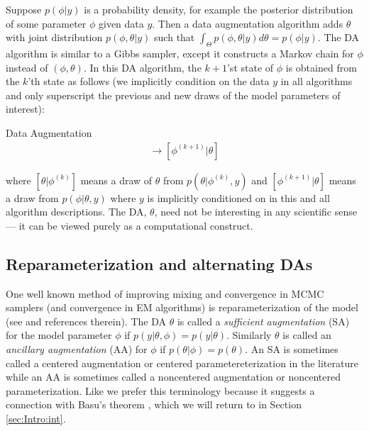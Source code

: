 \documentclass[12pt]{article}
\begin{document}
Suppose $p(\phi|y)$ is a probability density, for example the posterior distribution of some parameter $\phi$ given data $y$. %
Then a data augmentation algorithm adds $\theta$ with joint distribution $p(\phi,\theta|y)$ such that $\int_{\Theta}p(\phi,\theta|y)d\theta = p(\phi|y)$. The DA algorithm is similar to a Gibbs sampler, except it constructs a Markov chain for $\phi$ instead of $(\phi, \theta)$. In this DA algorithm, the $k+1$'st state of $\phi$ is obtained from the $k$'th state as follows (we implicitly condition on the data $y$ in all algorithms and only superscript the previous and new draws of the model parameters of interest):
\begin{alg*}[DA]Data Augmentation\label{alg:DA}
  \begin{align*}
  [\theta|\phi^{(k)}] \to [\phi^{(k+1)}|\theta]
\end{align*}
\end{alg*}
\noindent where $[\theta|\phi^{(k)}]$ means a draw of $\theta$ from $p(\theta|\phi^{(k)},y)$ and $[\phi^{(k+1)}|\theta]$ means a draw from $p(\phi|\theta,y)$ where $y$ is implicitly conditioned on in this and all algorithm descriptions. The DA, $\theta$, need not be interesting in any scientific sense --- it can be viewed purely as a computational construct. 

\subsection{Reparameterization and alternating DAs}

One well known method of improving mixing and convergence in MCMC samplers (and convergence in EM algorithms) is reparameterization of the model (see  \citet{papaspiliopoulos2007general} and references therein). The DA $\theta$ is called a {\it sufficient augmentation} (SA) for the model parameter $\phi$ if $p(y|\theta,\phi)=p(y|\theta)$. Similarly $\theta$ is called an {\it ancillary augmentation} (AA) for $\phi$ if $p(\theta|\phi)=p(\theta)$. An SA is sometimes called a centered augmentation or centered parametereterization in the literature while an AA is sometimes called a noncentered augmentation or noncentered parameterization. Like \citet{yu2011center} we prefer this terminology because it suggests a connection with Basu's theorem \citep{basu1955statistics}, which we will return to in Section \ref{sec:Intro:int}.
\end{document}
